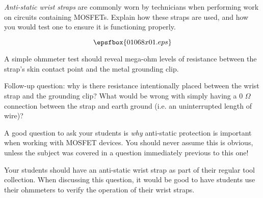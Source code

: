 

{\it Anti-static wrist straps} are commonly worn by technicians when performing work on circuits containing MOSFETs.  Explain how these straps are used, and how you would test one to ensure it is functioning properly.







$$\epsfbox{01068x01.eps}$$

A simple ohmmeter test should reveal mega-ohm levels of resistance between the strap's skin contact point and the metal grounding clip.

\vskip 10pt

Follow-up question: why is there resistance intentionally placed between the wrist strap and the grounding clip?  What would be wrong with simply having a 0 $\Omega$ connection between the strap and earth ground (i.e. an uninterrupted length of wire)?







A good question to ask your students is {\it why} anti-static protection is important when working with MOSFET devices.  You should never assume this is obvious, unless the subject was covered in a question immediately previous to this one!

Your students should have an anti-static wrist strap as part of their regular tool collection.  When discussing this question, it would be good to have students use their ohmmeters to verify the operation of their wrist straps.





